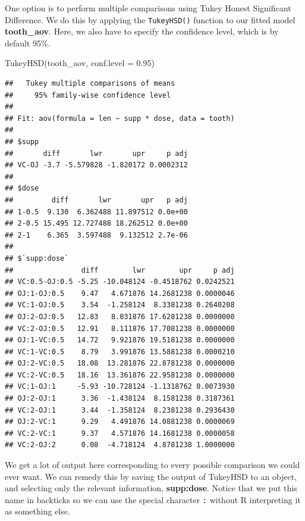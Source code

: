 \documentclass[
]{book}
\newenvironment{Shaded}{\begin{snugshade}}{\end{snugshade}}
\newcommand{\AttributeTok}[1]{\textcolor[rgb]{0.77,0.63,0.00}{#1}}
\newcommand{\FloatTok}[1]{\textcolor[rgb]{0.00,0.00,0.81}{#1}}
\newcommand{\FunctionTok}[1]{\textcolor[rgb]{0.00,0.00,0.00}{#1}}
\newcommand{\NormalTok}[1]{#1}
\newcommand{\OtherTok}[1]{\textcolor[rgb]{0.56,0.35,0.01}{#1}}
\newcommand{\SpecialCharTok}[1]{\textcolor[rgb]{0.00,0.00,0.00}{#1}}
\newcommand{\StringTok}[1]{\textcolor[rgb]{0.31,0.60,0.02}{#1}}
\begin{document}
One option is to perform multiple comparisons using Tukey Honest Significant Difference. We do this by applying the \texttt{TukeyHSD()} function to our fitted model \textbf{tooth\_aov}. Here, we also have to specify the confidence level, which is by default 95\%.

\begin{Shaded}
\begin{Highlighting}[]
\FunctionTok{TukeyHSD}\NormalTok{(tooth\_aov, }\AttributeTok{conf.level =} \FloatTok{0.95}\NormalTok{)}
\end{Highlighting}
\end{Shaded}

\begin{verbatim}
##   Tukey multiple comparisons of means
##     95% family-wise confidence level
## 
## Fit: aov(formula = len ~ supp * dose, data = tooth)
## 
## $supp
##       diff       lwr       upr     p adj
## VC-OJ -3.7 -5.579828 -1.820172 0.0002312
## 
## $dose
##         diff       lwr       upr   p adj
## 1-0.5  9.130  6.362488 11.897512 0.0e+00
## 2-0.5 15.495 12.727488 18.262512 0.0e+00
## 2-1    6.365  3.597488  9.132512 2.7e-06
## 
## $`supp:dose`
##                diff        lwr        upr     p adj
## VC:0.5-OJ:0.5 -5.25 -10.048124 -0.4518762 0.0242521
## OJ:1-OJ:0.5    9.47   4.671876 14.2681238 0.0000046
## VC:1-OJ:0.5    3.54  -1.258124  8.3381238 0.2640208
## OJ:2-OJ:0.5   12.83   8.031876 17.6281238 0.0000000
## VC:2-OJ:0.5   12.91   8.111876 17.7081238 0.0000000
## OJ:1-VC:0.5   14.72   9.921876 19.5181238 0.0000000
## VC:1-VC:0.5    8.79   3.991876 13.5881238 0.0000210
## OJ:2-VC:0.5   18.08  13.281876 22.8781238 0.0000000
## VC:2-VC:0.5   18.16  13.361876 22.9581238 0.0000000
## VC:1-OJ:1     -5.93 -10.728124 -1.1318762 0.0073930
## OJ:2-OJ:1      3.36  -1.438124  8.1581238 0.3187361
## VC:2-OJ:1      3.44  -1.358124  8.2381238 0.2936430
## OJ:2-VC:1      9.29   4.491876 14.0881238 0.0000069
## VC:2-VC:1      9.37   4.571876 14.1681238 0.0000058
## VC:2-OJ:2      0.08  -4.718124  4.8781238 1.0000000
\end{verbatim}

We get a lot of output here corresponding to every possible comparison we could ever want. We can remedy this by saving the output of TukeyHSD to an object, and selecting only the relevant information, \textbf{supp:dose}. Notice that we put this name in backticks so we can use the special character \texttt{:} without R interpreting it as something else.

\begin{Shaded}
\end{Shaded}
\end{document}
